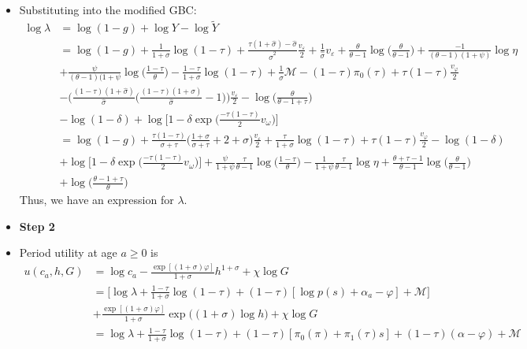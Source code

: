 \documentclass{article}
\newcommand{\M}{\mathcal{M}}
\begin{document}
\begin{itemize}
\begin{align*}
\end{align*}
\item Substituting into the modified GBC:
\begin{align*}
\log \lambda 
&= \log (1-g) + \log Y - \log \tilde Y\\
&= \log (1-g) + \frac{1}{1+\sigma} \log (1-\tau) + \frac{\tau(1+\hat\sigma) - \hat \sigma}{\hat \sigma^2}\frac{v_\varepsilon}{2} + \frac{1}{\hat\sigma} v_\varepsilon + \frac{\theta}{\theta-1}\log\Big( \frac{\theta}{\theta-1} \Big) + \frac{-1}{(\theta-1)(1+\psi)} \log \eta\\ &+ \frac{\psi}{(\theta-1)(1+\psi} \log \Big( \frac{1-\tau}{\theta} \Big) - \frac{1-\tau}{1+\sigma} \log(1-\tau) + \frac{1}{\hat\sigma} \M - (1-\tau)\pi_0(\tau) + \tau(1-\tau)\frac{v_\varphi}{2} \\
& - \Big( \frac{(1-\tau)(1+\hat\sigma)}{\hat \sigma}\Big(\frac{(1-\tau)(1+\hat\sigma)}{\hat \sigma} - 1 \Big)\Big) \frac{v_\varepsilon}{2} - \log\Bigg(  \frac{\theta}{\theta - 1 + \tau}\Bigg) \\
&- \log(1-\delta) + \log\Big[ 1 - \delta \exp\Big( \frac{-\tau(1-\tau)}{2}v_\omega \Big) \Big]\\
&= \log (1-g) + \frac{\tau(1-\tau)}{\sigma + \tau} \Big( \frac{1+\sigma}{\sigma + \tau} + 2 + \sigma \Big)\frac{v_\varepsilon}{2} + \frac{\tau}{1+\sigma} \log(1-\tau) + \tau(1-\tau)\frac{v_\varphi}{2} - \log(1-\delta)  \\
&+ \log \Big[ 1 - \delta \exp\Big( \frac{-\tau(1-\tau)}{2}v_\omega \Big) \Big] + \frac{\psi}{1+\psi}\frac{\tau}{\theta-1}\log \Big( \frac{1-\tau}{\theta}\Big) - \frac{1}{1+\psi}\frac{\tau}{\theta-1} \log \eta + \frac{\theta + \tau - 1}{\theta - 1} \log \Big( \frac{\theta}{\theta - 1} \Big) \\
&+ \log \Big( \frac{\theta - 1 + \tau}{\theta} \Big)
\end{align*}
Thus, we have an expression for $\lambda$.
\pagebreak
\item \textbf{Step 2}
\item Period utility at age $a \ge 0$ is
\begin{align*}
u(c_a, h, G) 
&= 
\log c_a - \frac{\exp[(1+\sigma)\varphi]}{1+\sigma} h^{1+\sigma} + \chi \log G\\
&= \Bigg[ \log \lambda + \frac{1-\tau}{1+\sigma} \log (1-\tau) + (1-\tau)[\log p(s) + \alpha_a - \varphi] + \M \Bigg]\\
&+\frac{\exp[(1+\sigma)\varphi]}{1+\sigma} \exp\Big( (1+\sigma) \log h \Big) + \chi \log G\\
&=  \log \lambda + \frac{1-\tau}{1+\sigma} \log (1-\tau) + (1-\tau)[\pi_0(\pi) + \pi_1(\tau)s] + (1-\tau)(\alpha - \varphi) + \M \\

\end{align*}
\end{itemize}
\end{document}
